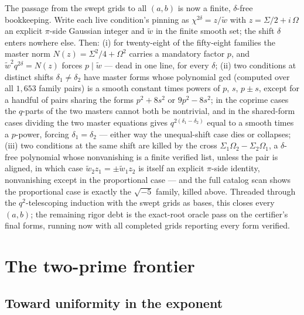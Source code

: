\documentclass[11pt]{article}
\theoremstyle{remark}
\begin{document}
The passage from the swept grids to all $(a,b)$ is now a finite,
$\delta$-free bookkeeping.  Write each live condition's pinning as
$\chi^{2\delta}=z/\tilde w$ with $z=\Sigma/2+i\,\Omega$ an explicit
$\pi$-side Gaussian integer and $\tilde w$ in the finite smooth set; the
shift $\delta$ enters nowhere else.  Then:
(i) for twenty-eight of the fifty-eight families the master norm
$N(z)=\Sigma^2/4+\Omega^2$ carries a mandatory factor $p$, and
$\tilde w^2q^{2\delta}=N(z)$ forces $p\mid\tilde w$ --- dead in one line,
for every $\delta$;
(ii) two conditions at distinct shifts $\delta_1\neq\delta_2$ have
master forms whose polynomial gcd (computed over all $1{,}653$ family
pairs) is a smooth constant times powers of $p$, $s$, $p\pm s$, except
for a handful of pairs sharing the forms $p^2+8s^2$ or $9p^2-8s^2$;
in the coprime cases the $q$-parts of the two masters cannot both be
nontrivial, and in the shared-form cases dividing the two master
equations gives $q^{2(\delta_1-\delta_2)}$ equal to a smooth times a
$p$-power, forcing $\delta_1=\delta_2$ --- either way the unequal-shift
case dies or collapses;
(iii) two conditions at the same shift are killed by the cross
$\Sigma_1\Omega_2-\Sigma_2\Omega_1$, a $\delta$-free polynomial whose
nonvanishing is a finite verified list, unless the pair is aligned, in
which case $\tilde w_2z_1=\pm\tilde w_1z_2$ is itself an explicit
$\pi$-side identity, nonvanishing except in the proportional case ---
and the full catalog scan shows the proportional case is exactly the
$\sqrt{-5}$ family, killed above.
Threaded through the $q^2$-telescoping induction with the swept grids as
bases, this closes every $(a,b)$; the remaining rigor debt is the
exact-root oracle pass on the certifier's final forms, running now with
all completed grids reporting every form verified.

\section{The two-prime frontier}

\subsection*{Toward uniformity in the exponent}
\end{document}
